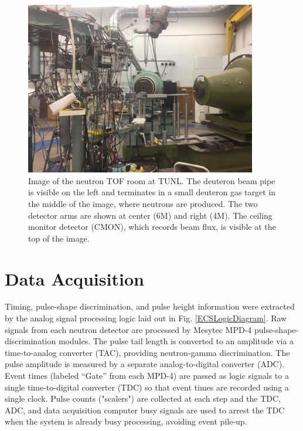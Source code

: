 \begin{figure}[h]
    \centering
    \includegraphics[width = 0.9\textwidth]{figures/TOFRoomPhoto.jpg}
    \caption[Image of the neutron TOF room at TUNL] 
    {
    Image of the neutron TOF room at TUNL. The deuteron beam pipe is visible on the left and
    terminates in a small deuteron gas target in the middle of the image, where neutrons are
    produced. The two detector arms are shown at center (6M) and right (4M). The ceiling
    monitor detector (CMON), which records beam flux, is visible at the top of the image.
    }
    \label{TOFRoomPhoto}
\end{figure}

\section{Data Acquisition}
Timing, pulse-shape discrimination, and pulse height information were
extracted by the analog signal processing logic laid out in Fig. \ref{ECSLogicDiagram}.
Raw signals from each neutron detector are processed by Mesytec MPD-4
pulse-shape-discrimination modules. The pulse tail length is converted to an
amplitude via a time-to-analog converter (TAC), providing neutron-gamma
discrimination. The pulse amplitude is measured by a separate
analog-to-digital converter (ADC). Event times (labeled ``Gate'' from each MPD-4)
are passed as logic signals to a single time-to-digital converter (TDC) so that
event times are recorded using a single clock. Pulse counts ("scalers") are
collected at each step and the TDC, ADC, and data acquisition computer busy
signals are used to arrest the TDC when the system is already busy processing,
avoiding event pile-up.

